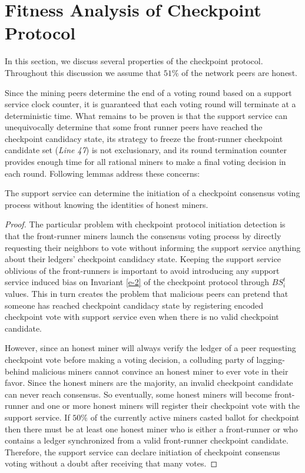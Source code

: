         
\section{Fitness Analysis of Checkpoint Protocol}
\label{s-analysis}
In this section, we discuss several properties of the checkpoint protocol. Throughout this discussion we assume that $51\%$ of the network peers are honest.

Since the mining peers determine the end of a voting round based on a support service clock counter, it is guaranteed that each voting round will terminate at a deterministic time. What remains to be proven is that the support service can unequivocally determine that some front runner peers have reached the checkpoint candidacy state, its strategy to freeze the front-runner checkpoint candidate set (\textit{Line 47}) is not exclusionary, and its round termination counter provides enough time for all rational miners to make a final voting decision in each round. Following lemmas address these concerns:     

\begin{lemma}
\label{l-proto-init}
The support service can determine the initiation of a checkpoint consensus voting process without knowing the identities of honest miners.  
\end{lemma}
\begin{proof}
The particular problem with checkpoint protocol initiation detection is that the front-runner miners launch the consensus voting process by directly requesting their neighbors to vote without informing the support service anything about their ledgers' checkpoint candidacy state. Keeping the support service oblivious of the front-runners is important to avoid introducing any support service induced bias on Invariant \ref{e-2} of the checkpoint protocol through $BS_i^t$ values. This in turn creates the problem that malicious peers can pretend that someone has reached checkpoint candidacy state by registering encoded checkpoint vote with support service even when there is no valid checkpoint candidate.

However, since an honest miner will always verify the ledger of a peer requesting checkpoint vote before making a voting decision, a colluding party of lagging-behind malicious miners cannot convince an honest miner to ever vote in their favor. Since the honest miners are the majority, an invalid checkpoint candidate can never reach consensus. So eventually, some honest miners will become front-runner and one or more honest miners will register their checkpoint vote with the support service. If $50\%$ of the currently active miners casted ballot for checkpoint then there must be at least one honest miner who is either a front-runner or who contains a ledger synchronized from a valid front-runner checkpoint candidate. Therefore, the support service can declare initiation of checkpoint consensus voting without a doubt after receiving that many votes. 
\end{proof}

